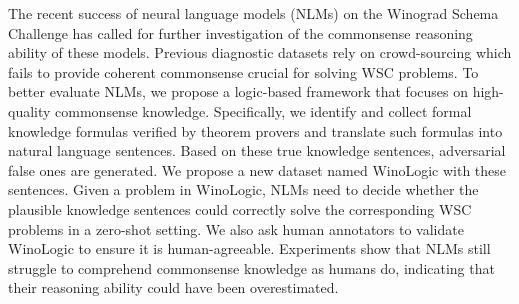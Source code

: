 The recent success of neural language models (NLMs) on the Winograd Schema Challenge has called for further investigation of the commonsense reasoning ability of these models. Previous diagnostic datasets rely on crowd-sourcing which fails to provide coherent commonsense crucial for solving WSC problems. To better evaluate NLMs, we propose a logic-based framework that focuses on high-quality commonsense knowledge. Specifically, we identify and collect formal knowledge formulas verified by theorem provers and translate such formulas into natural language sentences. Based on these true knowledge sentences, adversarial false ones are generated. We propose a new dataset named WinoLogic with these sentences. Given a problem in WinoLogic, NLMs need to decide whether the plausible knowledge sentences could correctly solve the corresponding WSC problems in a zero-shot setting. We also ask human annotators to validate WinoLogic to ensure it is human-agreeable. Experiments show that NLMs still struggle to comprehend commonsense knowledge as humans do, indicating that their reasoning ability could have been overestimated.

